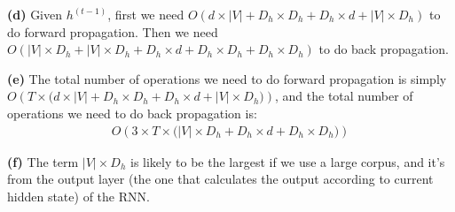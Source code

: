 \documentclass[10pt, a4paper]{ctexart}
\begin{document}
{\bf{(d)}} Given $h^{(t-1)}$, first we need $O(d\times |V|+D_h\times D_h+D_h\times d+|V|\times D_h)$ to do forward propagation. Then we need $O(|V|\times D_h+|V|\times D_h+D_h\times d+D_h\times D_h+D_h\times D_h)$ to do back propagation.\par
{\bf{(e)}} The total number of operations we need to do forward propagation is simply $O(T\times \big(d\times |V|+D_h\times D_h+D_h\times d+|V|\times D_h\big))$, and the total number of operations we need to do back propagation is:
\begin{align*}
    O(3\times T\times\big(|V|\times D_h+D_h\times d+D_h\times D_h\big)) 
\end{align*}\par
{\bf{(f)}} The term $|V|\times D_h$ is likely to be the largest if we use a large corpus, and it's from the output layer (the one that calculates the output according to current hidden state) of the RNN.
\end{document}

